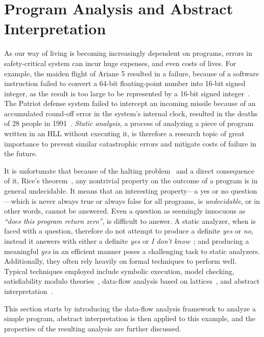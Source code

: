 \section{Program Analysis and Abstract Interpretation}
\label{bg:sec:abstract_interpretation}

As our way of living is becoming increasingly dependent on programs, errors
in safety-critical system can incur huge expenses, and even costs of lives.
For example, the maiden flight of Ariane 5 resulted in a failure, because of
a software instruction failed to convert a 64-bit floating-point number into
16-bit signed integer, as the result is too large to be represented by a 16-bit
signed integer~\cite{dowson97}.  The Patriot defense system failed to intercept
an incoming missile because of an accumulated round-off error in the system's
internal clock, resulted in the deaths of 28 people in 1991~\cite{patriot}.
\emph{Static analysis}, a process of analyzing a piece of program written in
an HLL without executing it, is therefore a research topic of great importance
to prevent similar catastrophic errors and mitigate costs of failure in the
future.

It is unfortunate that because of the halting problem~\cite{turing37} and
a direct consequence of it, Rice's theorem~\cite{rice53}, any nontrivial
property on the outcome of a program is in general undecidable.  It means
that an interesting property---a yes or no question---which is never always
true or always false for all programs, is \emph{undecidable}, or in other
words, cannot be answered.  Even a question as seemingly innocuous as
\emph{``does this program return zero''}, is difficult to answer.  A static
analyzer, when is faced with a question, therefore do not attempt to produce
a definite \emph{yes} or \emph{no}, instead it answers with either a definite
\emph{yes} or \emph{I don't know}~\cite{mine04}; and producing a meaningful
\emph{yes} in an efficient manner poses a challenging task to static analyzers.
Additionally, they often rely heavily on formal techniques to perform well.
Typical techniques employed include symbolic execution, model checking,
satisfiability modulo theories~\cite{demoura08}, data-flow analysis based on
lattices~\cite{nielson99}, and abstract interpretation~\cite{cousot77}.

This section starts by introducing the data-flow analysis framework to analyze
a simple program, abstract interpretation is then applied to this example, and
the properties of the resulting analysis are further discussed.

